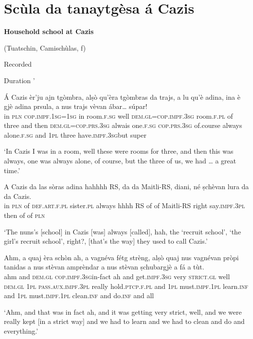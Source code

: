 \section{Scùla da tanaytgèsa á Cazis}


\textbf{Household school at Cazis}

\noindent
(Tuatschin, Camischùlas, f)

\noindent
Recorded

\noindent
Duration '
\bigskip

\begin{linenumbers}
\gll    Á Cazis èr’ju ajn tgòmbra, alṣò qu’èra tgòmbras da trajs, a lu qu’è adina, ina è gjè adina prsula, a nus trajs vèvan ábar… súpar!\\
in \textsc{pln} \textsc{cop.impf.1sg=1sg} in room.\textsc{f.sg} well \textsc{dem.gl=cop.impf.3sg} room.\textsc{f.pl} of three and then \textsc{dem.gl=cop.prs.3sg} alwais  one.\textsc{f.sg} \textsc{cop.prs.3sg} of.course always alone.\textsc{f.sg} and \textsc{1pl} three have.\textsc{impf.3sg}but super\\
\end{linenumbers}
\medskip
\glt `In Cazis I was in a room, well these were rooms for three, and then this was always, one was always alone, of course, but the three of us, we had … a great time.'
\medskip

\begin{linenumbers}
\gll    A Cazis da las sòras adina hahhhh RS, da da Maitli-RS, diani, né ṣchèvan lura da da Cazis.\\
in \textsc{pln} of \textsc{def.art.f.pl} sister.\textsc{pl} always hhhh RS of of Maitli-RS\footnotemark{} right say.\textsc{impf.3pl} then of of \textsc{pln}\\
\end{linenumbers}
\medskip
{} 
\glt `The nuns’s [school] in  Cazis [was] always [called], hah, the ‘recruit school’, ‘the girl’s recruit school’, right?, [that’s the way] they used to call Cazis.'
\medskip

\begin{linenumbers}
\gll    Ahm, a quaj èra schòn ah, a vagnéva fétg strèng, alṣò quaj nus vagnévan pròpi tanidas a nus stèvan amprèndar a nus stèvan ṣchubargjè a fá a tùt.\\
ahm and \textsc{dem.gl} \textsc{cop.impf.3sg}in-fact ah and get.\textsc{impf.3sg} very \textsc{strict.gl} well \textsc{dem.gl} \textsc{1pl} \textsc{pass.aux.impf.3pl} really hold.\textsc{ptcp.f.pl} and \textsc{1pl} must.\textsc{impf.1pl} learn.\textsc{inf} and \textsc{1pl}  must.\textsc{impf.1pl} clean.\textsc{inf} and do.\textsc{inf} and all\\
\end{linenumbers}
\medskip
\glt `Ahm, and that was in fact ah, and it was getting very strict, well, and we were really kept [in a strict way] and we had to learn and we had to clean and do and everything.'
\medskip

